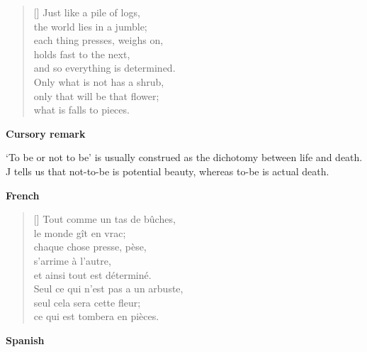 \documentclass[a4paper,12pt,twoside,final]{book}
\begin{document}
\newpage



\settowidth{\versewidth}{and so everything is determined.}

\begin{verse}[\versewidth]
  Just like a pile of logs, \\
  the world lies in a jumble; \\
  each thing presses, weighs on, \\
  holds fast to the next, \\
  and so everything is determined. \\
  Only what is not has a shrub, \\
  only that will be that flower; \\
  what is falls to pieces. \\
\end{verse}

\bigskip

\noindent \textbf{Cursory remark}

\medskip

`To be or not to be' is usually construed as the dichotomy between
life and death. J tells us that not-to-be is potential beauty, whereas
to-be is actual death.

\bigskip

\noindent \textbf{French}


\settowidth{\versewidth}{Seul ce qui n'est pas relève de l'arbuste,}

\begin{verse}[\versewidth]
  Tout comme un tas de bûches, \\
  le monde gît en vrac; \\
  chaque chose presse, pèse, \\
  s'arrime à l'autre, \\
  et ainsi tout est déterminé. \\
  Seul ce qui n'est pas a un arbuste, \\
  seul cela sera cette fleur; \\
  ce qui est tombera en pièces. \\
\end{verse}

\bigskip

\noindent \textbf{Spanish}

\end{document}
